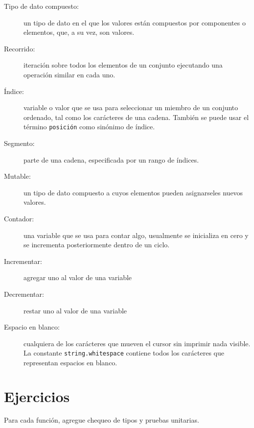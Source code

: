 \begin{description}

\item[Tipo de dato compuesto:] un tipo de dato en el que los valores
están compuestos por componentes o elementos, que, a su vez, son 
valores.

\item[Recorrido:] iteración sobre todos los elementos de un conjunto
ejecutando una operación similar en cada uno.

\item[Índice:] variable o valor que se usa para seleccionar un 
miembro de un conjunto ordenado, tal como los carácteres de una
cadena. También se puede usar el término \texttt{posición} como sinónimo
de índice.

\item[Segmento:] parte de una cadena, especificada por un rango
de índices.

\item[Mutable:] un tipo de dato compuesto a cuyos elementos pueden 
asignarseles nuevos valores.

\item[Contador:] una variable que se usa para contar algo, usualmente
se inicializa en cero y se incrementa posteriormente dentro de un ciclo.

\item[Incrementar:] agregar uno al valor de una variable

\item[Decrementar:] restar uno al valor de una variable

\item[Espacio en blanco:] cualquiera de los carácteres que mueven el 
cursor sin imprimir nada visible. La constante \texttt{string.whitespace}
contiene todos los carácteres que representan espacios en blanco.


\end{description}

\section{Ejercicios}


Para cada función, agregue chequeo de tipos y pruebas unitarias.


